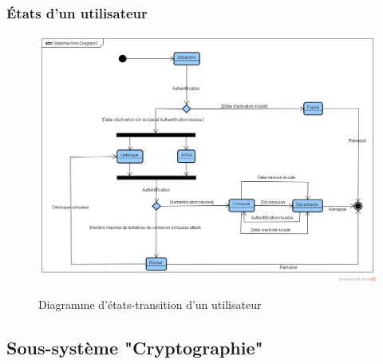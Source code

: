 \subsubsection{États d'un utilisateur}
\begin{figure}[H]
	\centering
	\begin{minipage}{12cm}
		\centering
		{\includegraphics[height=0.35\textheight, width=1\textwidth]{fig/Users-statemachine-diiagram.png}}
	\end{minipage}
	\caption{Diagramme d'états-transition d'un utilisateur}
	\label{fig:7.13}
\end{figure}

\subsection{Sous-système "Cryptographie"}
